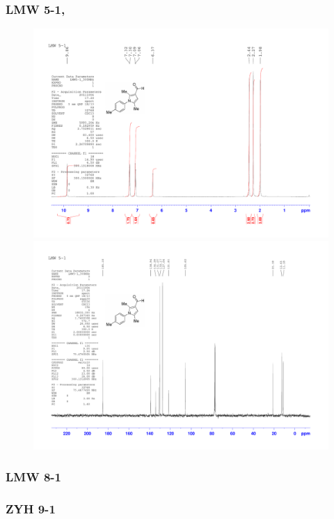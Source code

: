 \documentclass[12pt, a4paper,titlepage]{article}
\begin{document}
{\subsubsection*{LMW 5-1, \pageref{exp:LMW5}}
\label{spec:LMW5}
	\begin{figure}[H] 
	\begin{center}
	\includegraphics[width=14.5cm]{expdata/LMW5/1H}
	\includegraphics[width=14.5cm]{expdata/LMW5/13C}
	\end{center}
	\end{figure}

\subsubsection*{LMW 8-1}

\subsubsection*{ZYH 9-1}

}
\end{document}
